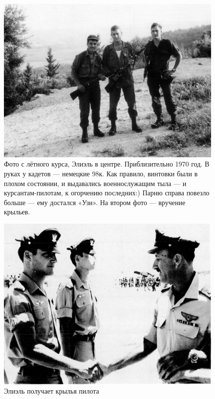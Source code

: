 \begin{figure}[h!tb] 
	\centering\includegraphics[scale=0.5]{History_Yosya/zoOi_QoHBIM.jpg}
	\caption{Фото с лётного курса, Элиэль в центре. Приблизительно 1970 год. В руках у кадетов — немецкие 98к. Как правило, винтовки были в плохом состоянии, и выдавались военнослужащим тыла — и курсантам-пилотам, к огорчению последних:) Парню справа повезло больше — ему достался «Узи». На втором фото — вручение крыльев. }%
\end{figure}
\begin{figure}[h!tb] 
	\centering\includegraphics[scale=0.6]{History_Yosya/-t9MlzauznA.jpg}
	\caption{Элиэль получает крылья пилота}%
\end{figure}

